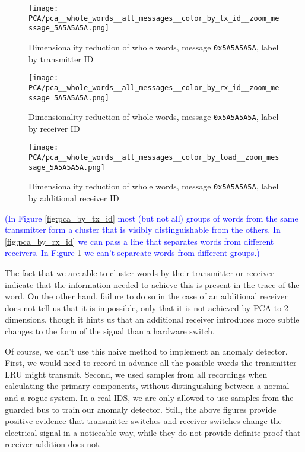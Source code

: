 \documentclass[compsoc,conference,a4paper]{IEEEtran}
\begin{document}
  \begin{figure}[t]
    \centering
    \texttt{[image: PCA/pca\_\_whole\_words\_\_all\_messages\_\_color\_by\_tx\_id\_\_zoom\_message\_5A5A5A5A.png]}
    \caption{Dimensionality reduction of whole words, message \texttt{0x5A5A5A5A}, label by transmitter ID}
    \label{fig:pca_by_tx_id}
  
    \texttt{[image: PCA/pca\_\_whole\_words\_\_all\_messages\_\_color\_by\_rx\_id\_\_zoom\_message\_5A5A5A5A.png]}
    \caption{Dimensionality reduction of whole words, message \texttt{0x5A5A5A5A}, label by receiver ID}
    \label{fig:pca_by_rx_id}
  
    \centering
    \texttt{[image: PCA/pca\_\_whole\_words\_\_all\_messages\_\_color\_by\_load\_\_zoom\_message\_5A5A5A5A.png]}
    \caption{Dimensionality reduction of whole words, message \texttt{0x5A5A5A5A}, label by additional receiver ID}
    \label{fig:pca_by_load}
  \end{figure}
  
  \textcolor{blue}{(In Figure \ref{fig:pca_by_tx_id} most (but not all) groups of words from the same transmitter form a cluster that is visibly distinguishable from the others. In \ref{fig:pca_by_rx_id} we can pass a line that separates words from different receivers. In Figure \ref{fig:pca_by_load} we can't separeate words from different groups.)}
  
  The fact that we are able to cluster words by their transmitter or receiver indicate that the information needed to achieve this is present in the trace of the word. On the other hand, failure to do so in the case of an additional receiver does not tell us that it is impossible, only that it is not achieved by PCA to 2 dimensions, though it hints us that an additional receiver introduces more subtle changes to the form of the signal than a hardware switch.
  
  Of course, we can't use this naive method to implement an anomaly detector. First, we would need to record in advance all the possible words the transmitter LRU might transmit. Second, we used samples from all recordings when calculating the primary components, without distinguishing between a normal and a rogue system. In a real IDS, we are only allowed to use samples from the guarded bus to train our anomaly detector. Still, the above figures provide positive evidence that transmitter switches and receiver switches change the electrical signal in a noticeable way, while they do not provide definite proof that receiver addition does not.
  
\end{document}
